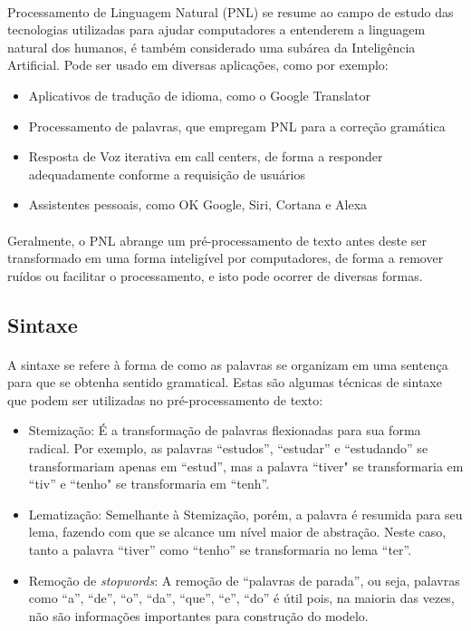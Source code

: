 \documentclass[grad,numbers]{coppe}
\begin{document}
  	\paragraph{}Processamento de Linguagem Natural (PNL) se resume ao campo de estudo das tecnologias utilizadas para ajudar computadores a entenderem a linguagem natural dos humanos, é também considerado uma subárea da Inteligência Artificial. Pode ser usado em diversas aplicações\cite{simple-nlp}, como por exemplo:
  	\begin{itemize}
  		\item Aplicativos de tradução de idioma, como o Google Translator
  		\item Processamento de palavras, que empregam PNL para a correção gramática
  		\item Resposta de Voz iterativa em call centers, de forma a responder adequadamente conforme a requisição de usuários
  		\item Assistentes pessoais, como OK Google, Siri, Cortana e Alexa
  	\end{itemize}
	  \paragraph{}Geralmente, o PNL abrange um pré-processamento de texto antes deste ser transformado em uma forma inteligível por computadores, de forma a remover ruídos ou facilitar o processamento, e isto pode ocorrer de diversas formas.
	  \subsection{Sintaxe}
	  	\paragraph{}A sintaxe se refere à forma de como as palavras se organizam em uma sentença para que se obtenha sentido gramatical. Estas são algumas técnicas de sintaxe que podem ser utilizadas no pré-processamento de texto:
	  	\begin{itemize}
	  		\item Stemização: É a transformação de palavras flexionadas para sua forma radical. Por exemplo, as palavras ``estudos'', ``estudar'' e ``estudando'' se transformariam apenas em ``estud'', mas a palavra ``tiver" se transformaria em ``tiv'' e ``tenho" se transformaria em ``tenh''.
	  		\item Lematização: Semelhante à Stemização, porém, a palavra é resumida para seu lema, fazendo com que se alcance um nível maior de abstração. Neste caso, tanto a palavra ``tiver'' como ``tenho'' se transformaria no lema  ``ter''.
	  		\item Remoção de \textit{stopwords}: A remoção de ``palavras de parada'', ou seja, palavras como ``a'', ``de'', ``o'', ``da'', ``que'', ``e'', ``do'' é útil pois, na maioria das vezes, não são informações importantes para construção do modelo.
	  	\end{itemize}
\end{document}
